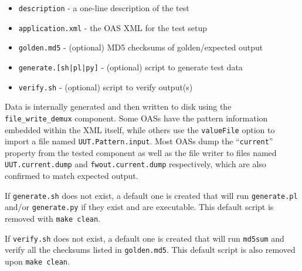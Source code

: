 \documentclass{article}
\begin{document}
\begin{itemize}{}{}
	\item \texttt{description} - a one-line description of the test
	\item \texttt{application.xml} - the OAS XML for the test setup
	\item \texttt{golden.md5} - (optional) MD5 checksums of golden/expected output
	\item \texttt{generate.[sh|pl|py]} - (optional) script to generate test data
	\item \texttt{verify.sh} - (optional) script to verify output(s)
\end{itemize}
\begin{flushleft}
	Data is internally generated and then written to disk using the \verb+file_write_demux+ component. Some OASs have the pattern information embedded within the XML itself, while others use the \texttt{valueFile} option to import a file named \verb+UUT.Pattern.input+. Most OASs dump the ``\texttt{current}'' property from the tested component as well as the file writer to files named \verb+UUT.current.dump+ and \verb+fwout.current.dump+ respectively, which are also confirmed to match expected output.
	\medskip

	If \texttt{generate.sh} does not exist, a default one is created that will run \texttt{generate.pl} and/or \texttt{generate.py} if they exist and are executable. This default script is removed with \verb+make clean+.
	\medskip

	If \texttt{verify.sh} does not exist, a default one is created that will run \texttt{md5sum} and verify all the checksums listed in \texttt{golden.md5}. This default script is also removed upon \verb+make clean+.
	\medskip
\end{flushleft}
\end{document}
